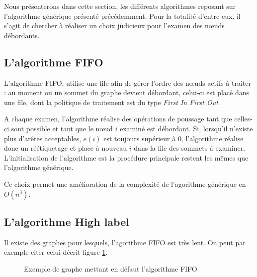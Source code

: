 Nous présenterons dans cette section, les différents algorithmes reposant sur l'algorithme générique
présenté précédemment. Pour la totalité d'entre eux, il s'agit de chercher à réaliser un choix
judicieux pour l'examen des n\oe uds débordants.

\subsection{L'algorithme FIFO}

L'algorithme FIFO, utilise une file afin de gérer l'ordre des n\oe uds actifs à traiter : au moment
ou un sommet du graphe devient débordant, celui-ci est placé dans une file, dont la politique de
traitement est du type \emph{First In First Out}. 

A chaque examen, l'algorithme réalise des opérations de poussage tant que celles-ci sont possible et
tant que le n\oe ud $i$ examiné est débordant. Si, lorsqu'il n'existe plus d'arêtes acceptables,
$e(i)$ est toujours supérieur à $0$, l'algorithme réalise donc un réétiquetage et place à nouveau
$i$ dans la file des sommets à examiner. L'initialisation de l'algorithme est la procédure
principale restent les mêmes que l'algorithme générique.

Ce choix permet une amélioration de la complexité de l'agorithme générique en $O(n^3)$.

\subsection{L'algorithme High label}

Il existe des graphes pour lesquels, l'agorithme FIFO est très lent. On peut par exemple citer
celui décrit figure \ref{bad_fifo}.

\begin{figure}
\begin{center}
\end{center}
\caption{Exemple de graphe mettant en défaut l'algorithme FIFO}
\label{bad_fifo}
\end{figure}

